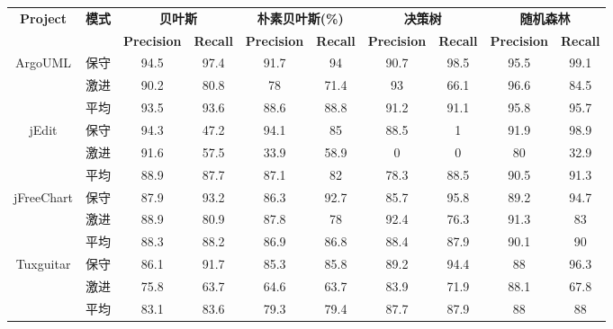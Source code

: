 \begin{table}[htbp]
\vspace{0.5em}\centering\wuhao
\begin{tabular}{cccccccccc}
\toprule[1.5pt]
\multirow{2}{*}{\textbf{Project}}&\multirow{2}{*}{\textbf{模式}}&\multicolumn{2}{c}{\textbf{ 贝叶斯}}&\multicolumn{2}{c}{\textbf{ 朴素贝叶斯(\%)}}&\multicolumn{2}{c}{\textbf{ 决策树}}&\multicolumn{2}{c}{\textbf{ 随机森林}}\\
&&\textbf{Precision}&\textbf{Recall}&\textbf{Precision}&\textbf{Recall}&\textbf{Precision}&\textbf{Recall}&\textbf{Precision}&\textbf{Recall}\\
\midrule[1pt]
\multirow{3}{*}{ArgoUML}
&保守	&94.5&	97.4&	91.7&	94&	90.7&	98.5&	95.5&	99.1\\
&激进	&90.2&	80.8&	78&	71.4&	93&	66.1&	96.6&	84.5\\
&平均	&93.5&	93.6&	88.6&	88.8&	91.2&	91.1&	95.8&	95.7\\

\multirow{3}{*}{jEdit}
&保守&	94.3&	47.2&	94.1&	85&	88.5&	1&	91.9&	98.9\\
&激进&	91.6&57.5&	33.9	&58.9	&0	&0	&80&	32.9\\
&平均&	88.9&	87.7&	87.1&	82&	78.3&	88.5&	90.5&	91.3\\

\multirow{3}{*}{jFreeChart}
&保守&	87.9&	93.2&	86.3&	92.7&	85.7&	95.8&	89.2&	94.7\\
&激进&	88.9&	80.9&	87.8&	78	&92.4	&76.3	&91.3	&83\\
&平均&	88.3&	88.2&	86.9&	86.8&	88.4&	87.9&	90.1&	90\\

\multirow{3}{*}{Tuxguitar}
&保守&	86.1&	91.7&	85.3&	85.8&	89.2&	94.4&	88&	96.3\\
&激进&	75.8&	63.7&	64.6&	63.7&	83.9&	71.9&	88.1&	67.8\\
&平均&	83.1&	83.6&	79.3&	79.4&	87.7&	87.9&	88&	88\\

\bottomrule[1.5pt]
\end{tabular}
\end{table}


